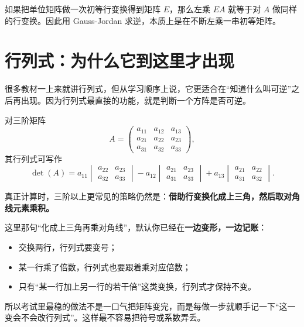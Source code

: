 \documentclass[11pt,oneside,UTF8]{ctexbook}
\newcommand{\important}[1]{\textcolor{Sakura}{\textbf{#1}}}
\begin{document}
\begin{summarybox}
如果把单位矩阵做一次初等行变换得到矩阵 \(E\)，那么左乘 \(EA\) 就等于对 \(A\) 做同样的行变换。因此用 Gauss-Jordan 求逆，本质上是在不断左乘一串初等矩阵。
\end{summarybox}

\section{行列式：为什么它到这里才出现}

很多教材一上来就讲行列式，但从学习顺序上说，它更适合在“知道什么叫可逆”之后再出现。因为行列式最直接的功能，就是判断一个方阵是否可逆。

对三阶矩阵
\[
A=
\begin{pmatrix}
a_{11}&a_{12}&a_{13}\\
a_{21}&a_{22}&a_{23}\\
a_{31}&a_{32}&a_{33}
\end{pmatrix},
\]
其行列式可写作
\[
\det(A)=
a_{11}
\begin{vmatrix}
a_{22}&a_{23}\\
a_{32}&a_{33}
\end{vmatrix}
-a_{12}
\begin{vmatrix}
a_{21}&a_{23}\\
a_{31}&a_{33}
\end{vmatrix}
+a_{13}
\begin{vmatrix}
a_{21}&a_{22}\\
a_{31}&a_{32}
\end{vmatrix}.
\]

真正计算时，三阶以上更常见的策略仍然是：\important{借助行变换化成上三角，然后取对角线元素乘积。}

\begin{summarybox}[一个很容易丢分的小提醒]
这里那句“化成上三角再乘对角线”，默认你已经在\important{一边变形，一边记账}：
\begin{itemize}
  \item 交换两行，行列式要变号；
  \item 某一行乘了倍数，行列式也要跟着乘对应倍数；
  \item 只有“某一行加上另一行的若干倍”这类变换，行列式才保持不变。
\end{itemize}
所以考试里最稳的做法不是一口气把矩阵变完，而是每做一步就顺手记一下“这一变会不会改行列式”。这样最不容易把符号或系数弄丢。
\end{summarybox}
\end{document}
